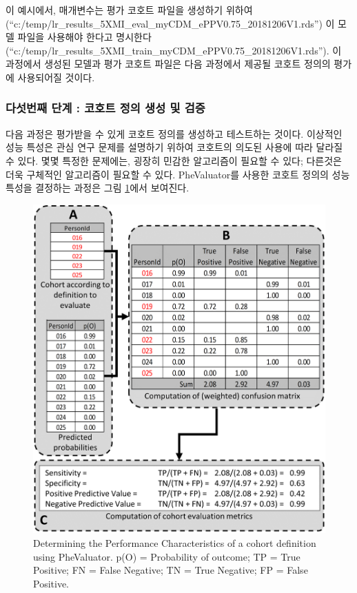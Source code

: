\documentclass[10.5pt]{book}
\theoremstyle{definition}
\theoremstyle{definition}
\theoremstyle{definition}
\theoremstyle{remark}
\begin{document}
이 예시에서, 매개변수는 평가 코호트 파일을 생성하기 위하여
(``c:/temp/lr\_results\_5XMI\_eval\_myCDM\_ePPV0.75\_20181206V1.rds'')
이 모델 파일을 사용해야 한다고 명시한다
(``c:/temp/lr\_results\_5XMI\_train\_myCDM\_ePPV0.75\_20181206V1.rds'').
이 과정에서 생성된 모델과 평가 코호트 파일은 다음 과정에서 제공될 코호트
정의의 평가에 사용되어질 것이다.

\subsubsection*{다섯번째 단계 : 코호트 정의 생성 및 검증}\label{------}

다음 과정은 평가받을 수 있게 코호트 정의를 생성하고 테스트하는 것이다.
이상적인 성능 특성은 관심 연구 문제를 설명하기 위하여 코호트의 의도된
사용에 따라 달라질 수 있다. 몇몇 특정한 문제에는, 굉장히 민감한
알고리즘이 필요할 수 있다; 다른것은 더욱 구체적인 알고리즘이 필요할 수
있다. PheValuator를 사용한 코호트 정의의 성능 특성을 결정하는 과정은
그림 \ref{fig:phevaluatorDiagram}에서 보여진다.

\begin{figure}

{\centering \includegraphics[width=1\linewidth]{images/ClinicalValidity/PheValuatorEvaluation} 

}

\caption{Determining the Performance Characteristics of a cohort definition using PheValuator. p(O) = Probability of outcome; TP = True Positive; FN = False Negative; TN = True Negative; FP = False Positive.}\label{fig:phevaluatorDiagram}
\end{figure}
\end{document}
